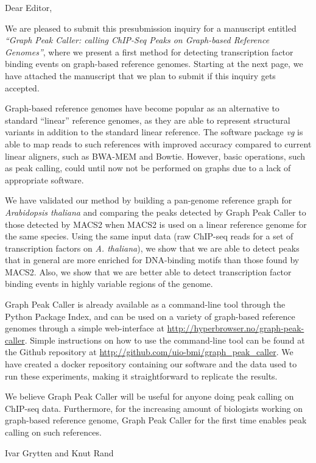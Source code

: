\documentclass[a4paper,11pt]{letter}
\begin{document}
\begin{letter}{}

\opening{Dear Editor,}

We are pleased to submit this presubmission inquiry for a manuscript entitled \emph{“Graph Peak Caller: calling ChIP-Seq Peaks on Graph-based Reference Genomes”}, where we present a first method for detecting transcription factor binding events on graph-based reference genomes. Starting at the next page, we have attached the manuscript that we plan to submit if this inquiry gets accepted.

Graph-based reference genomes have become popular as an alternative to standard “linear” reference genomes, as they are able to represent structural variants in addition to the standard linear reference. The software package \emph{vg} is able to map reads to such references with improved accuracy compared to current linear aligners, such as BWA-MEM and Bowtie. However, basic operations, such as peak calling, could until now not be performed on graphs due to a lack of appropriate software.

We have validated our method by building a pan-genome reference graph for \emph{Arabidopsis thaliana} and comparing the peaks detected by Graph Peak Caller to those detected by MACS2 when MACS2 is used on a linear reference genome for the same species. Using the same input data (raw ChIP-seq reads for a set of transcription factors on \emph{A. thaliana}), we show that we are able to detect peaks that in general are more enriched for DNA-binding motifs than those found by MACS2. Also, we show that we are better able to detect transcription factor binding events in highly variable regions of the genome. 

Graph Peak Caller is already available as a command-line tool through the Python Package Index, and can be used on a variety of graph-based reference genomes through a simple web-interface at \url{http://hyperbrowser.no/graph-peak-caller}. Simple instructions on how to use the command-line tool can be found at the Github repository at \url{http://github.com/uio-bmi/graph_peak_caller}. We have created a docker repository containing our software and the data used to run these experiments, making it straightforward to replicate the results.

We believe Graph Peak Caller will be useful for anyone doing peak calling on ChIP-seq data. Furthermore, for the increasing amount of biologists working on graph-based reference genome, Graph Peak Caller for the first time enables peak calling on such references.



\closing{Ivar Grytten and Knut Rand}

\end{letter}
\end{document}
